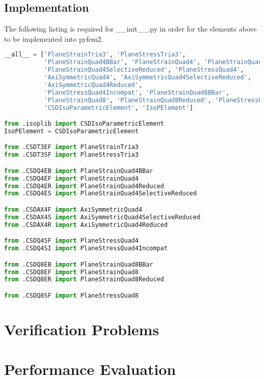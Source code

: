\documentclass[10pt,letterpaper]{report}
\numberwithin{equation}{chapter}
\begin{document}
\section{Implementation}
The following listing is required for \_\_init\_\_.py in order for the elements above to be implemented into pyfem2.
\begin{lstlisting}[language=Python]
__all__ = ['PlaneStrainTria3', 'PlaneStressTria3',
           'PlaneStrainQuad4BBar', 'PlaneStrainQuad4', 'PlaneStrainQuad4Reduced',
           'PlaneStrainQuad4SelectiveReduced', 'PlaneStressQuad4',
           'AxiSymmetricQuad4', 'AxiSymmetricQuad4SelectiveReduced',
           'AxiSymmetricQuad4Reduced',
           'PlaneStressQuad4Incompat', 'PlaneStrainQuad8BBar',
           'PlaneStrainQuad8', 'PlaneStrainQuad8Reduced', 'PlaneStressQuad8',
           'CSDIsoParametricElement', 'IsoPElement']

from .isoplib import CSDIsoParametricElement
IsoPElement = CSDIsoParametricElement

from .CSDT3EF import PlaneStrainTria3
from .CSDT3SF import PlaneStressTria3

from .CSDQ4EB import PlaneStrainQuad4BBar
from .CSDQ4EF import PlaneStrainQuad4
from .CSDQ4ER import PlaneStrainQuad4Reduced
from .CSDQ4ES import PlaneStrainQuad4SelectiveReduced

from .CSDAX4F import AxiSymmetricQuad4
from .CSDAX4S import AxiSymmetricQuad4SelectiveReduced
from .CSDAX4R import AxiSymmetricQuad4Reduced

from .CSDQ4SF import PlaneStressQuad4
from .CSDQ4SI import PlaneStressQuad4Incompat

from .CSDQ8EB import PlaneStrainQuad8BBar
from .CSDQ8EF import PlaneStrainQuad8
from .CSDQ8ER import PlaneStrainQuad8Reduced

from .CSDQ8SF import PlaneStressQuad8
\end{lstlisting}







\chapter{Verification Problems}

\chapter{Performance Evaluation}
\end{document}
